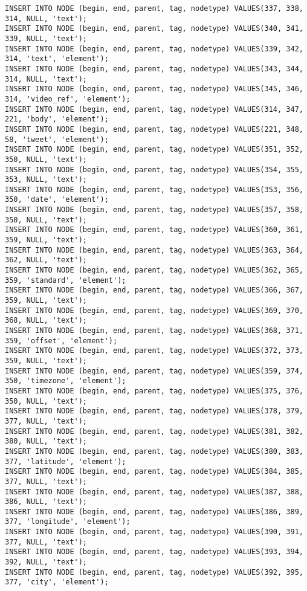 \begin{verbatim}
INSERT INTO NODE (begin, end, parent, tag, nodetype) VALUES(337, 338, 314, NULL, 'text');
INSERT INTO NODE (begin, end, parent, tag, nodetype) VALUES(340, 341, 339, NULL, 'text');
INSERT INTO NODE (begin, end, parent, tag, nodetype) VALUES(339, 342, 314, 'text', 'element');
INSERT INTO NODE (begin, end, parent, tag, nodetype) VALUES(343, 344, 314, NULL, 'text');
INSERT INTO NODE (begin, end, parent, tag, nodetype) VALUES(345, 346, 314, 'video_ref', 'element');
INSERT INTO NODE (begin, end, parent, tag, nodetype) VALUES(314, 347, 221, 'body', 'element');
INSERT INTO NODE (begin, end, parent, tag, nodetype) VALUES(221, 348, 58, 'tweet', 'element');
INSERT INTO NODE (begin, end, parent, tag, nodetype) VALUES(351, 352, 350, NULL, 'text');
INSERT INTO NODE (begin, end, parent, tag, nodetype) VALUES(354, 355, 353, NULL, 'text');
INSERT INTO NODE (begin, end, parent, tag, nodetype) VALUES(353, 356, 350, 'date', 'element');
INSERT INTO NODE (begin, end, parent, tag, nodetype) VALUES(357, 358, 350, NULL, 'text');
INSERT INTO NODE (begin, end, parent, tag, nodetype) VALUES(360, 361, 359, NULL, 'text');
INSERT INTO NODE (begin, end, parent, tag, nodetype) VALUES(363, 364, 362, NULL, 'text');
INSERT INTO NODE (begin, end, parent, tag, nodetype) VALUES(362, 365, 359, 'standard', 'element');
INSERT INTO NODE (begin, end, parent, tag, nodetype) VALUES(366, 367, 359, NULL, 'text');
INSERT INTO NODE (begin, end, parent, tag, nodetype) VALUES(369, 370, 368, NULL, 'text');
INSERT INTO NODE (begin, end, parent, tag, nodetype) VALUES(368, 371, 359, 'offset', 'element');
INSERT INTO NODE (begin, end, parent, tag, nodetype) VALUES(372, 373, 359, NULL, 'text');
INSERT INTO NODE (begin, end, parent, tag, nodetype) VALUES(359, 374, 350, 'timezone', 'element');
INSERT INTO NODE (begin, end, parent, tag, nodetype) VALUES(375, 376, 350, NULL, 'text');
INSERT INTO NODE (begin, end, parent, tag, nodetype) VALUES(378, 379, 377, NULL, 'text');
INSERT INTO NODE (begin, end, parent, tag, nodetype) VALUES(381, 382, 380, NULL, 'text');
INSERT INTO NODE (begin, end, parent, tag, nodetype) VALUES(380, 383, 377, 'latitude', 'element');
INSERT INTO NODE (begin, end, parent, tag, nodetype) VALUES(384, 385, 377, NULL, 'text');
INSERT INTO NODE (begin, end, parent, tag, nodetype) VALUES(387, 388, 386, NULL, 'text');
INSERT INTO NODE (begin, end, parent, tag, nodetype) VALUES(386, 389, 377, 'longitude', 'element');
INSERT INTO NODE (begin, end, parent, tag, nodetype) VALUES(390, 391, 377, NULL, 'text');
INSERT INTO NODE (begin, end, parent, tag, nodetype) VALUES(393, 394, 392, NULL, 'text');
INSERT INTO NODE (begin, end, parent, tag, nodetype) VALUES(392, 395, 377, 'city', 'element');

\end{verbatim}
